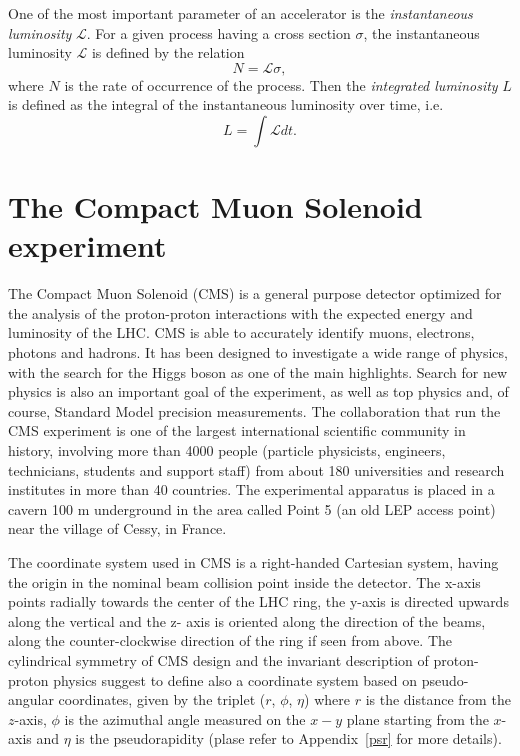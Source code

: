 One of the most important parameter of an accelerator is the
{\em instantaneous luminosity} $\mathcal{L}$. For a given process having a cross section $\sigma$, the
instantaneous luminosity $\mathcal{L}$ is defined by the relation
\begin{equation}
N= \mathcal{L} \sigma, \end{equation}
where $N$ is the rate of occurrence of the process. Then the {\em
  integrated luminosity} $L$ is defined as the integral of the
instantaneous luminosity over time, i.e.
\begin{equation}
L=\int \mathcal{L}  dt.
\end{equation}

\section{The Compact Muon Solenoid experiment}
The Compact Muon Solenoid (CMS)  is a general purpose detector
optimized for the analysis of the 
proton-proton interactions with the expected energy and luminosity of
the LHC. CMS is able to accurately identify muons, electrons, photons
and hadrons. It
has been designed to investigate a wide range of physics, with the search for the Higgs
boson as one of the main highlights. Search for new physics is also an important goal of the
experiment, as well as top physics and, of course, Standard Model precision measurements.
The collaboration that run the CMS experiment is one
of the largest international scientific community in history, involving more than 4000
people (particle physicists, engineers, technicians, students and support staff) from about
180 universities and research institutes in more than 40 countries.
The experimental apparatus is placed in a cavern 100 m underground in
the area called Point 5 (an old LEP access point) near the village of
Cessy, in France. 

The coordinate system used in CMS is a right-handed Cartesian system, having the origin
in the nominal beam collision point inside the detector. The x-axis points radially towards
the center of the LHC ring, the y-axis is directed upwards along the vertical and the z-
axis is oriented along the direction of the beams, along the counter-clockwise direction of
the ring if seen from above. The cylindrical symmetry of CMS design and the invariant
description of proton-proton physics suggest to define also a coordinate system based on
pseudo-angular coordinates, given by the triplet ($r$, $\phi$, $\eta$) where $r$ is the distance from
the $z$-axis, $\phi$ is the azimuthal angle measured on the $x-y$ plane starting from the $x$-axis
and $\eta$ is the pseudorapidity (plase refer to Appendix~\ref{psr}
for more details).

